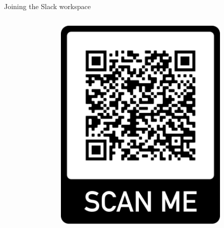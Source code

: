 \begin{frame}{Joining the Slack workspace}
\begin{columns}
\begin{column}[]{0.7\textwidth}
    \end{column}
    \begin{column}[]{0.3\textwidth}
      \begin{figure}
        \centering
        \includegraphics[width=0.9\textwidth]{frame.png}
      \end{figure}
    \end{column}
  \end{columns}
  
\end{frame}



